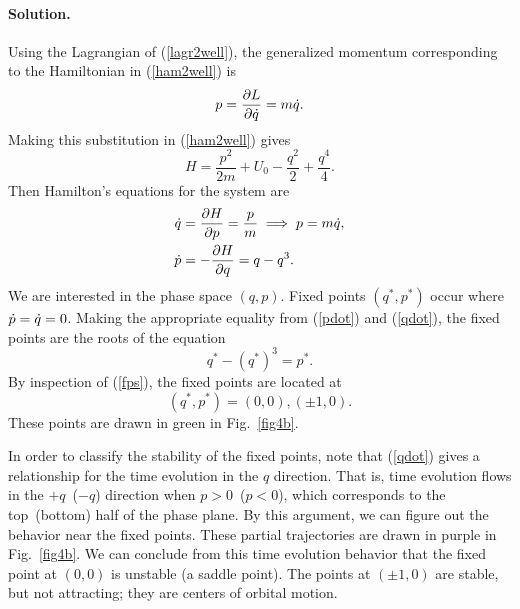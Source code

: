\documentclass[11pt]{article}
\newcommand{\refeq}[1]{(\ref{#1})}
\newenvironment{solution}
{
    \paragraph{Solution.}
    \ignorespaces
}
{
    \bigskip
}
\begin{document}
\newcommand{\qdd}{\ddot{q}}
\newcommand{\pd}{\dot{p}}
\newcommand{\dlq}{\delta q}
\newcommand{\dlp}{\delta p}

\begin{solution}
	Using the Lagrangian of \refeq{lagr2well}, the generalized momentum corresponding to the Hamiltonian in \refeq{ham2well} is
	\begin{equation}
		p = \pdv{L}{\dot{q}} = m\dot{q}.
	\end{equation}
	Making this substitution in \refeq{ham2well} gives
	\begin{equation}
		H = \frac{p^2}{2m} + U_0 - \frac{q^2}{2} + \frac{q^4}{4}.
	\end{equation}
	Then Hamilton's equations for the system are
	\begin{align}
		\qd &= \pdv{H}{p} = \frac{p}{m} \implies p = m\qd, \label{qdot} \\
		\pd &= -\pdv{H}{q} = q - q^3. \label{pdot}
	\end{align}
	We are interested in the phase space $(q, p)$.  Fixed points $(q^*, p^*)$ occur where $\pd = \qd = 0$.  Making the appropriate equality from \refeq{pdot} and \refeq{qdot}, the fixed points are the roots of the equation
	\begin{equation} \label{fps}
		q^* - (q^*)^3 = p^*.
	\end{equation}
	By inspection of \refeq{fps}, the fixed points are located at
	\begin{equation}
		(q^*, p^*) = (0,0), (\pm 1, 0).
	\end{equation}
	These points are drawn in green in Fig.~\ref{fig4b}.
	
	In order to classify the stability of the fixed points, note that \refeq{qdot} gives a relationship for the time evolution in the $q$ direction.  That is, time evolution flows in the $+q$~($-q$) direction when $p > 0$~($p < 0$), which corresponds to the top~(bottom) half of the phase plane.  By this argument, we can figure out the behavior near the fixed points.  These partial trajectories are drawn in purple in Fig.~\ref{fig4b}.  We can conclude from this time evolution behavior that the fixed point at $(0, 0)$ is unstable (a saddle point).  The points at $(\pm 1, 0)$ are stable, but not attracting; they are centers of orbital motion.
	

\end{solution}
\end{document}
